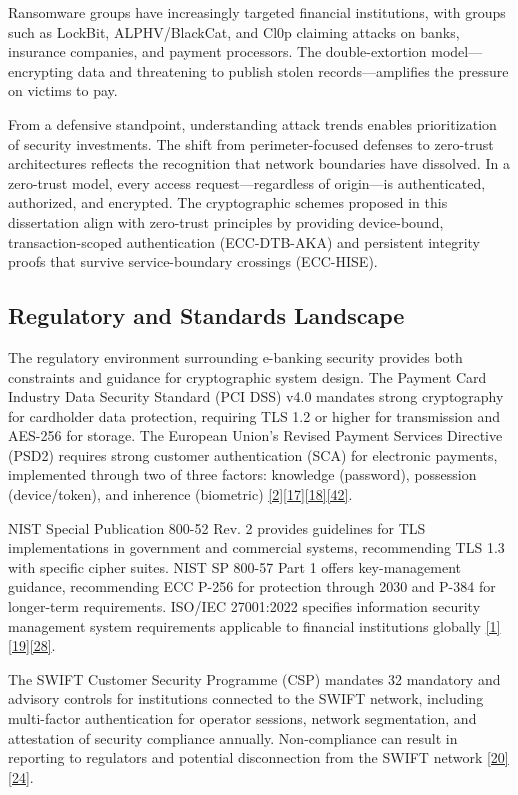 \indent Ransomware groups have increasingly targeted financial institutions, with groups such as LockBit, ALPHV/BlackCat, and Cl0p claiming attacks on banks, insurance companies, and payment processors. The double-extortion model---encrypting data and threatening to publish stolen records---amplifies the pressure on victims to pay.

\indent From a defensive standpoint, understanding attack trends enables prioritization of security investments. The shift from perimeter-focused defenses to zero-trust architectures reflects the recognition that network boundaries have dissolved. In a zero-trust model, every access request---regardless of origin---is authenticated, authorized, and encrypted. The cryptographic schemes proposed in this dissertation align with zero-trust principles by providing device-bound, transaction-scoped authentication (ECC-DTB-AKA) and persistent integrity proofs that survive service-boundary crossings (ECC-HISE).

\subsection{Regulatory and Standards Landscape}

\indent The regulatory environment surrounding e-banking security provides both constraints and guidance for cryptographic system design. The Payment Card Industry Data Security Standard (PCI DSS) v4.0 mandates strong cryptography for cardholder data protection, requiring TLS 1.2 or higher for transmission and AES-256 for storage. The European Union's Revised Payment Services Directive (PSD2) requires strong customer authentication (SCA) for electronic payments, implemented through two of three factors: knowledge (password), possession (device/token), and inherence (biometric) \hyperref[ref:2]{[2]}\hyperref[ref:17]{[17]}\hyperref[ref:18]{[18]}\hyperref[ref:42]{[42]}.

\indent NIST Special Publication 800-52 Rev. 2 provides guidelines for TLS implementations in government and commercial systems, recommending TLS 1.3 with specific cipher suites. NIST SP 800-57 Part 1 offers key-management guidance, recommending ECC P-256 for protection through 2030 and P-384 for longer-term requirements. ISO/IEC 27001:2022 specifies information security management system requirements applicable to financial institutions globally \hyperref[ref:1]{[1]}\hyperref[ref:19]{[19]}\hyperref[ref:28]{[28]}.

\indent The SWIFT Customer Security Programme (CSP) mandates 32 mandatory and advisory controls for institutions connected to the SWIFT network, including multi-factor authentication for operator sessions, network segmentation, and attestation of security compliance annually. Non-compliance can result in reporting to regulators and potential disconnection from the SWIFT network \hyperref[ref:20]{[20]}\hyperref[ref:24]{[24]}.

